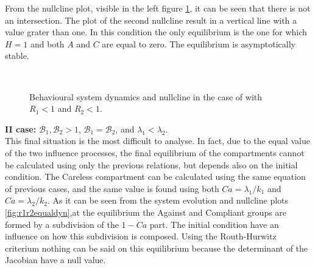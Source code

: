 From the nullcline plot, visible in the left figure \ref{fig:r1r2less1dyn}, it can be seen that there is not an intersection. The plot of the second nullcline result in a vertical line with a value grater than one. In this condition the only equilibrium is the one for which $H = 1$ and both $A$ and $C$ are equal to zero. 
The equilibrium is asymptotically stable. 
\begin{figure}[h]
	\centering
	 \quad
	 \\
	\caption[Behavioural model third case]{Behavioural system dynamics and nullcline in the case of   with $R_1 < 1$ and $R_2 < 1$.}
	\label{fig:r1r2less1dyn}
\end{figure}

\textbf{II case: } $\mathcal{B}_1, \mathcal{B}_2 >1$, $\mathcal{B}_1 =  \mathcal{B}_2$, and $\lambda_1 < \lambda_2$.\\
This final situation is the most difficult to analyse. In fact, due to the equal value of the two influence processes, the final equilibrium of the compartments cannot be calculated using only the previous relations, but depends also on the initial condition. 
The Careless compartment can be calculated using the same equation of previous cases, and the same value is found using both $Ca = \lambda_1/k_1$ and $Ca = \lambda_2/k_2$. As it can be seen from the system evolution and nullcline plots \ref{fig:r1r2equaldyn},at the equilibrium the Against and Compliant groups are formed by a subdivision of the $1 - Ca$ part. The initial condition have an influence on how this subdivision is composed. Using the Routh-Hurwitz criterium nothing can be said on this equilibrium because the determinant of the Jacobian have a null value.

